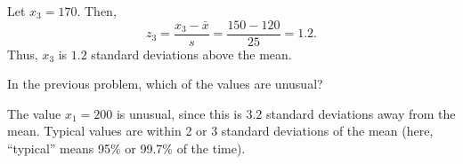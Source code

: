 \documentclass[11pt]{exam}
\begin{document}
\begin{questions}
\begin{parts}
\begin{solution}
Let $x_3 = 170$.  Then,
\[
  z_3 = \frac{x_3 - \bar x}{s} = \frac{150 - 120}{25} = 1.2.
\]
Thus, $x_3$ is $1.2$ standard deviations above the mean.
\end{solution}


\end{parts}

\question In the previous problem, which of the values are unusual?

\begin{solution}
The value $x_1 = 200$ is unusual, since this is $3.2$ standard deviations
away from the mean.  Typical values are within 2 or 3 standard deviations of
the mean (here, ``typical'' means 95\% or 99.7\% of the time).
\end{solution}


% 
% 
% 
% 
% 
% 
% 
% 
% 
% 
% 
% 
% 
% 


\end{questions}
\end{document}
